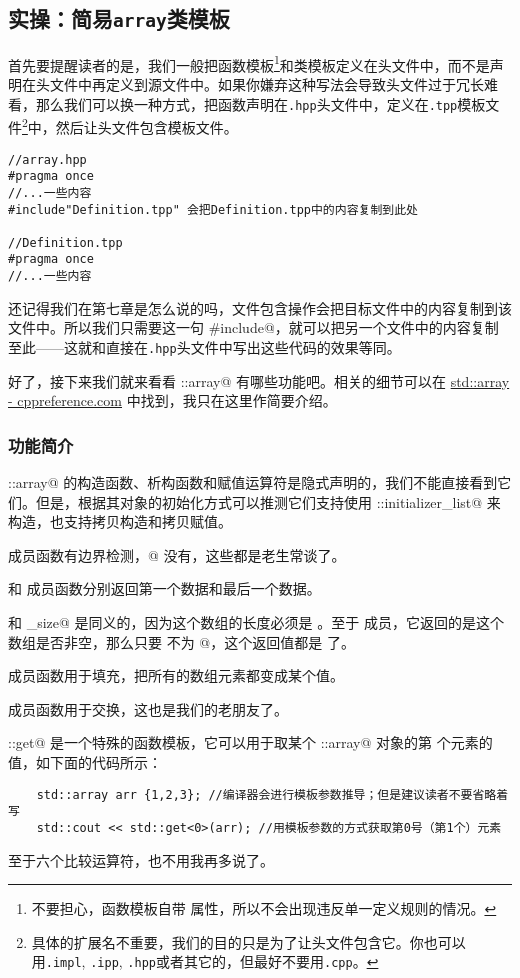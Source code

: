 \subsection*{实操：简易\texttt{array}类模板}
首先要提醒读者的是，我们一般把函数模板\footnote{不要担心，函数模板自带 \lstinline@inline@ 属性，所以不会出现违反单一定义规则的情况。}和类模板定义在头文件中，而不是声明在头文件中再定义到源文件中。如果你嫌弃这种写法会导致头文件过于冗长难看，那么我们可以换一种方式，把函数声明在\texttt{.hpp}头文件中，定义在\texttt{.tpp}模板文件\footnote{具体的扩展名不重要，我们的目的只是为了让头文件包含它。你也可以用\texttt{.impl}, \texttt{.ipp}, \texttt{.hpp}或者其它的，但最好不要用\texttt{.cpp}。}中，然后让头文件包含模板文件。
\begin{lstlisting}
//array.hpp
#pragma once
//...一些内容
#include"Definition.tpp" 会把Definition.tpp中的内容复制到此处

//Definition.tpp
#pragma once
//...一些内容
\end{lstlisting}
还记得我们在第七章是怎么说的吗，文件包含操作会把目标文件中的内容复制到该文件中。所以我们只需要这一句 \lstinline@#include@，就可以把另一个文件中的内容复制至此——这就和直接在\texttt{.hpp}头文件中写出这些代码的效果等同。\par
好了，接下来我们就来看看 \lstinline@std::array@ 有哪些功能吧。相关的细节可以在 \href{https://en.cppreference.com/w/cpp/container/array}{std::array - cppreference.com} 中找到，我只在这里作简要介绍。
\subsubsection*{功能简介}
\lstinline@std::array@ 的构造函数、析构函数和赋值运算符是隐式声明的，我们不能直接看到它们。但是，根据其对象的初始化方式可以推测它们支持使用 \lstinline@std::initializer_list@ 来构造，也支持拷贝构造和拷贝赋值。\par
\lstinline@at@ 成员函数有边界检测，\lstinline@operator[]@ 没有，这些都是老生常谈了。\par
\lstinline@front@ 和 \lstinline@back@ 成员函数分别返回第一个数据和最后一个数据。\par
\lstinline@size@ 和 \lstinline@max_size@ 是同义的，因为这个数组的长度必须是 \lstinline@N@。至于 \lstinline@empty@ 成员，它返回的是这个数组是否非空，那么只要 \lstinline@N@ 不为 @，这个返回值都是 \lstinline@false@ 了。\par
\lstinline@fill@ 成员函数用于填充，把所有的数组元素都变成某个值。\par
\lstinline@swap@ 成员函数用于交换，这也是我们的老朋友了。\par
\lstinline@std::get@ 是一个特殊的函数模板，它可以用于取某个 \lstinline@std::array@ 对象的第 \lstinline@I@ 个元素的值，如下面的代码所示：
\begin{lstlisting}
    std::array arr {1,2,3}; //编译器会进行模板参数推导；但是建议读者不要省略着写
    std::cout << std::get<0>(arr); //用模板参数的方式获取第0号（第1个）元素
\end{lstlisting}\par
至于六个比较运算符，也不用我再多说了。\par
